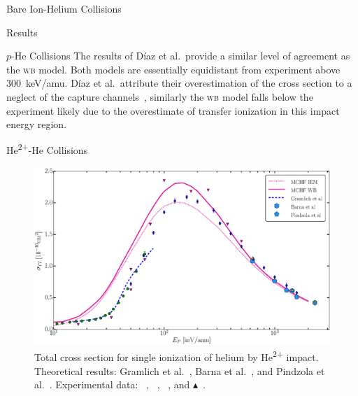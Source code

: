 \documentclass[a5paper, 9 pt]{extreport}
\begin{document}
\begin{chapter}{Bare Ion-Helium Collisions \label{chap:p-he2p-he}}
\begin{section}{Results \label{sec:phe2p-res}}
\begin{subsection}{\texorpdfstring{$p$}{p}-He Collisions \label{sec:phe-res}}
         The results of D\'{i}az et al.\ provide a similar level of agreement as the \textsc{wb} model.
         Both models are essentially equidistant from experiment above 300~keV/amu. D\'{i}az
         et al.\ attribute their overestimation of the cross section to a neglect of the
         capture channels~\cite{DMS-00}, similarly the \textsc{wb} model falls below the experiment
         likely due to the overestimate of transfer ionization in this impact energy region.

      \end{subsection}

      \begin{subsection}{\texorpdfstring{He\textsuperscript{2+}}{He2+}-He Collisions
                         \label{sec:he2phe-res}}

         \begin{figure}[t]
            \centering
            \includegraphics[width = 0.95 \linewidth]{./images/he2phe/he2phe-TI.eps}
            \caption[Total cross section for single ionization of helium by He\textsuperscript{2+}
                     impact.]{Total cross section for single ionization of helium by
                     He\textsuperscript{2+} impact. Theoretical results: Gramlich
                     et al.~\cite{GGS-89}, Barna
                     et al.~\cite{BTB-05}, and Pindzola et al.~\cite{PRC-07}.
                     Experimental data: {\color{blue}{$\blacklozenge$}}~\cite{SG85},
                     {\color{OliveGreen}{$\bullet$}}~\cite{SG89},
                     {\color{RedViolet}{$\blacktriangledown$}}~\cite{Dubois87}, and
                     {\color{GreenYellow}$\blacktriangle$}~\cite{KAH84}. \label{fig:he2phe-ti}}
         \end{figure}


\end{subsection}
\end{section}
\end{chapter}
\end{document}
